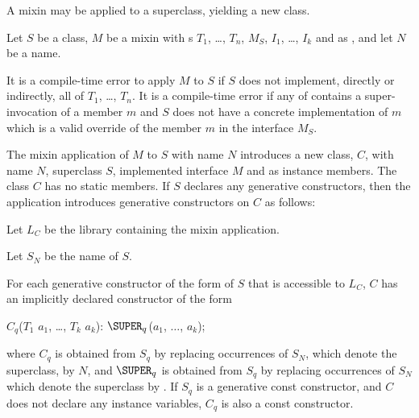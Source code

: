 \documentclass[makeidx]{article}
\begin{document}
\LMHash{}%
A mixin may be applied to a superclass, yielding a new class.

\LMHash{}%
Let $S$ be a class,
$M$ be a mixin with s $T_1$, \ldots, $T_n$,
 $M_S$,
 $I_1$, \ldots, $I_k$ and
 as ,
and let $N$ be a name.

\LMHash{}%
It is a compile-time error to apply $M$ to $S$ if $S$ does not implement,
directly or indirectly, all of $T_1$, \ldots, $T_n$.
It is a compile-time error if any of  contains a
super-invocation of a member $m$
and $S$ does not have a concrete
implementation of $m$ which is a valid override of the member $m$ in
the interface $M_S$.

\LMHash{}%
The mixin application of $M$ to $S$ with name $N$ introduces a new
class, $C$, with name $N$, superclass $S$,
implemented interface $M$
and  as instance members.
The class $C$ has no static members.
If $S$ declares any generative constructors, then the application
introduces generative constructors on $C$ as follows:

\LMHash{}%
Let $L_C$ be the library containing the mixin application.

Let $S_N$ be the name of $S$.

For each generative constructor of the form
of $S$ that is accessible to $L_C$, $C$ has
an implicitly declared constructor of the form

\begin{normativeDartCode}
$C_q$($T_{1}$ $a_{1}$, \ldots, $T_{k}$ $a_{k}$): $\SUPER_q$($a_{1}$, $\ldots$, $a_{k}$);
\end{normativeDartCode}

\noindent
where $C_q$ is obtained from $S_q$ by replacing occurrences of $S_N$,
which denote the superclass, by $N$, and $\SUPER_q$ is obtained from $S_q$ by
replacing occurrences of $S_N$ which denote the superclass by \SUPER.
If $S_q$ is a generative const constructor, and $C$ does not declare any
instance variables, $C_q$ is also a const constructor.
\end{document}
